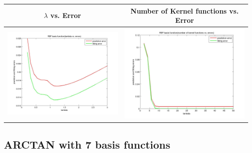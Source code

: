 \documentclass[fleqn]{article}
\begin{document}
\begin{center}
  \begin{longtable}{ c | c }
	\multicolumn{1}{c}{$\lambda$ vs. Error} & 
	\multicolumn{1}{c}{Number of Kernel functions vs. Error}  \\
    \hline
    \includegraphics[scale=0.2]{./pics/task4/RBF basis function_fitting_lambda_errors.jpg}  & \includegraphics[scale=0.2]{./pics/task4/RBF basis function_numfunctions_errors.jpg} \\
    \hline
  \end{longtable}
\end{center}

\subsection{ARCTAN with 7 basis functions}
\end{document}
